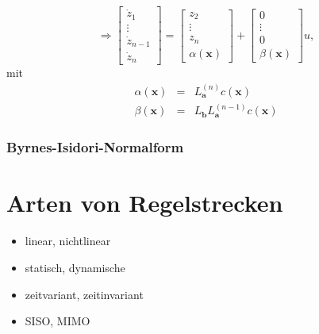 			\[\Rightarrow\begin{bmatrix}\dot{z}_{1}\\\vdots\\\dot{z}_{n-1}\\ \dot{z}_{n}\end{bmatrix} = \begin{bmatrix}z_{2}\\\vdots\\ z_{n}\\\alpha(\bm{x})\end{bmatrix}+\begin{bmatrix}0\\\vdots\\ 0\\\beta(\bm{x})\end{bmatrix}u,\]
			mit
			\begin{eqnarray} 
			\alpha(\bm{x}) &=& L_{\bm{a}}^{(n)}c(\bm{x}) \nonumber\\
			\beta(\bm{x}) &=& L_{\bm{b}}L_{\bm{a}}^{(n-1)}c(\bm{x}) \nonumber
			\end{eqnarray}
			
	\subsubsection{Byrnes-Isidori-Normalform}
	
	
\section{Arten von Regelstrecken}
	\begin{itemize}
		\item  linear, nichtlinear
		\item statisch, dynamische
		\item zeitvariant, zeitinvariant
		\item SISO, MIMO
	\end{itemize}


